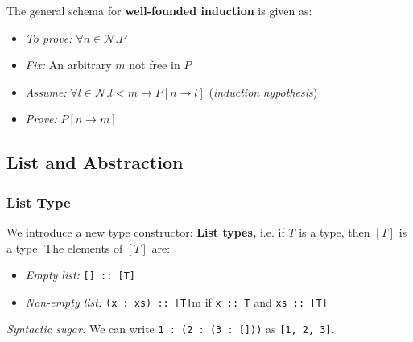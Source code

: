 \documentclass[a4paper]{extarticle}
\begin{document}
The general schema for \textbf{well-founded induction} is given as:

\begin{itemize}
    \item \textit{To prove:} \(\forall n \in \mathcal{N}.P\)
    \item \textit{Fix:} An arbitrary \(m\) not free in \(P\)
    \item \textit{Assume:} \(\forall l \in \mathcal{N} . l < m \to P[n \to l]\) (\textit{induction hypothesis})
    \item \textit{Prove:} \(P[n \to m]\)
\end{itemize}

\subsection{List and Abstraction}

\subsubsection{List Type}

We introduce a new type constructor: \textbf{List types,} i.e. if \(T\) is a type, then \([T]\) is a type. The elements of \([T]\) are:

\begin{itemize}
    \item \textit{Empty list:} \verb|[] :: [T]|
    \item \textit{Non-empty list:} \verb|(x : xs) :: [T]|m if \verb|x :: T| and \verb|xs :: [T]|
\end{itemize}

\textit{Syntactic sugar:} We can write \verb|1 : (2 : (3 : []))| as \verb|[1, 2, 3]|.
\end{document}
